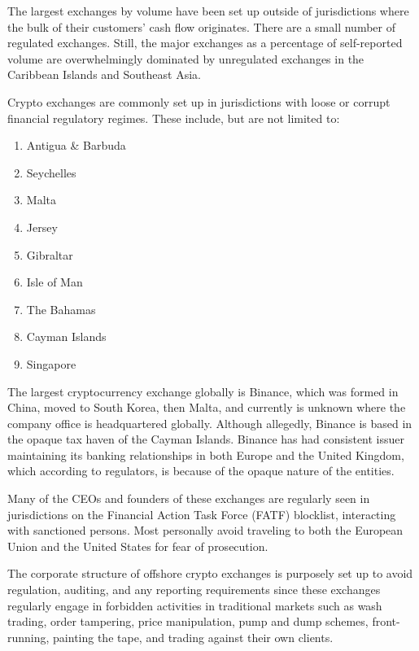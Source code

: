 
The largest exchanges by volume have been set up outside of jurisdictions where
the bulk of their customers' cash flow originates. There are a small number of
regulated exchanges. Still, the major exchanges as a percentage of self-reported
volume are overwhelmingly dominated by unregulated exchanges in the Caribbean
Islands and Southeast Asia.

Crypto exchanges are commonly set up in jurisdictions with loose or corrupt
financial regulatory regimes. \cite{ivaniuk_cryptocurrency_2020} These include,
but are not limited to:

\begin{enumerate}
\item Antigua \& Barbuda
\item Seychelles
\item Malta
\item Jersey
\item Gibraltar
\item Isle of Man
\item The Bahamas
\item Cayman Islands
\item Singapore
\end{enumerate}

The largest cryptocurrency exchange globally is Binance, which was formed in
China, moved to South Korea, then Malta, and currently is unknown where the
company office is headquartered globally. Although allegedly, Binance is based
in the opaque tax haven of the Cayman Islands. Binance has had consistent issuer
maintaining its banking relationships in both Europe and the United Kingdom,
which according to regulators, is because of the opaque nature of the entities.
\cite{feinstein_impact_2020}


Many of the CEOs and founders of these exchanges are regularly seen in
jurisdictions on the Financial Action Task Force (FATF) blocklist, interacting
with sanctioned persons. Most personally avoid traveling to both the European
Union and the United States for fear of prosecution.

The corporate structure of offshore crypto exchanges is purposely set up to
avoid regulation, auditing, and any reporting requirements since these exchanges
regularly engage in forbidden activities in traditional markets such as wash
trading, order tampering, price manipulation, pump and dump schemes,
front-running, painting the tape, and trading against their own clients.
\cite{feinstein_impact_2020}

